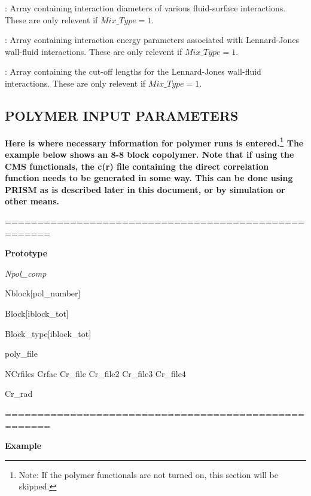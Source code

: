 \documentclass[10pt,onecolumn]{article}
\begin{document}
\vspace{0.1in}
:  Array containing interaction diameters of various
fluid-surface interactions.  These are only relevent if $Mix\_Type=1$.

\vspace{0.1in}
:  Array containing interaction energy parameters
associated with Lennard-Jones wall-fluid interactions.  These are only relevent if $Mix\_Type=1$.

\vspace{0.1in}
:  Array containing the cut-off lengths for the
Lennard-Jones wall-fluid interactions. These are only relevent if $Mix\_Type=1$.

\vfill
\break

\subsection{POLYMER INPUT PARAMETERS}
{\bf Here is where
necessary information for polymer runs is entered.\footnote{Note: If
the polymer functionals are not turned on, this section
will be skipped.}  The example below shows an 8-8 block
copolymer.  Note that if using the CMS functionals, the c(r) file containing the direct correlation function needs to be generated in some way.  This can be done using PRISM as is described later in this document, or by simulation or other means.}


\vspace{0.1in}
\noindent=====================================================

{\bf Prototype}

{\it Npol\_comp

Nblock[pol\_number]

Block[iblock\_tot]

Block\_type[iblock\_tot]


poly\_file

NCrfiles  Crfac  Cr\_file  Cr\_file2 Cr\_file3 Cr\_file4

Cr\_rad

}

\noindent=====================================================

{\bf Example}
\end{document}

